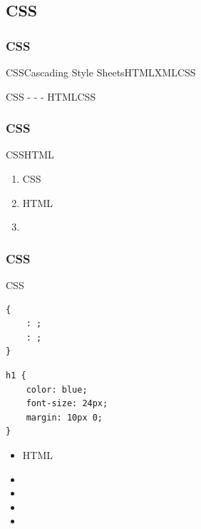 \hypertarget{css-1}{%
\subsection{CSS}\label{css-1}}

\hypertarget{css-2}{%
\subsubsection{CSS}\label{css-2}}

CSSCascading Style SheetsHTMLXMLCSS\important{}

CSS -  -  -
HTMLCSS

\hypertarget{css-3}{%
\subsubsection{CSS}\label{css-3}}

CSS\important{}HTML\important{}

\begin{enumerate}
\def\labelenumi{\arabic{enumi}.}
\item
  \important{}CSS
\item
  \important{}HTML
\item
  \important{}
\end{enumerate}

\hypertarget{css-4}{%
\subsubsection{CSS}\label{css-4}}

CSS\important{}\important{}

\begin{lstlisting}[style=css]
 {
    : ;
    : ;
}
\end{lstlisting}

\begin{lstlisting}[style=css]
h1 {
    color: blue;
    font-size: 24px;
    margin: 10px 0;
}
\end{lstlisting}

\important{}

\begin{itemize}
\item
  HTML
\item
  \important{} \code{{}}
\item
\item
\item
  \important{;}
\end{itemize}

